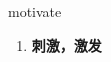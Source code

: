 
\begin{frame}
{\huge motivate}
\begin{center}
\begin{enumerate}\Large
  \item \textbf{刺激，激发}
\end{enumerate}
\end{center}
\end{frame}
